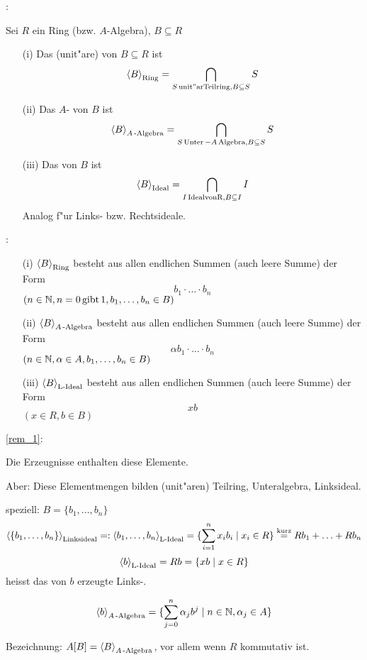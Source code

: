 :{Sei $R$ ein Ring (bzw. $A$-Algebra), $B\subseteq R$
 \begin{enumerate}
 \item[(i)] Das (unit"are)  von $B\subseteq R$ ist
 \[ {\left\langle B\right\rangle}_{\operatorname{Ring}} = \bigcap_{S \operatorname{unit"ar Teilring}, B \subseteq S} S\]
 \item[(ii)] Das $A$- von $B$ ist
 \[ {\left\langle B\right\rangle}_{A \operatorname{-Algebra}} = \bigcap_{S \operatorname{Unter}-A\operatorname{Algebra},
 B \subseteq S} S\] 
 \item[(iii)] Das  von $B$ ist
  \[ {\left\langle B\right\rangle}_{\operatorname{Ideal}} = \bigcap_{I \operatorname{Ideal von R}, B \subseteq I} I\]
  Analog f"ur Links- bzw. Rechtsideale.
 \end{enumerate}}  
\remark{}:{
 \label{rem_1}
 \begin{enumerate}
 \item[(i)] ${\left\langle B\right\rangle}_{\operatorname{Ring}}$ besteht aus allen endlichen Summen (auch leere Summe)
 der Form \[b_1 \cdot \ldots \cdot b_n \] \hfill$(n\in \mathbb N, n=0 \operatorname{gibt} 1,b_1, \ldots,b_n \in B)$
 \item[(ii)] ${\left\langle B\right\rangle}_{A \operatorname{-Algebra}}$ besteht aus allen endlichen Summen (auch leere Summe)
 der Form 
 \[\alpha b_1 \cdot \ldots \cdot b_n \] \hfill $(n\in \mathbb N, \alpha \in A, b_1, \ldots, b_n \in B)$
 \item[(iii)] ${\left\langle B\right\rangle}_{\operatorname{L-Ideal}}$ besteht aus allen endlichen Summen (auch leere Summe)
 der Form 
 \[ xb\] \hfill $ (x\in R, b\in B)$
\end{enumerate}} 
\proof \ref{rem_1}:{Die Erzeugnisse enthalten diese Elemente.

 Aber: Diese Elementmengen bilden (unit"aren) Teilring, Unteralgebra, Linksideal.

 speziell: $B=\{b_1, \ldots, b_n \}$
 \[{\left\langle\{b_1,\ldots, b_n\}\right\rangle}_{\operatorname{Linksideal}}=:{\left\langle b_1, \ldots, b_n\right\rangle}_{\operatorname{L-Ideal}}
 =\{\sum_{i=1}^{n}x_ib_i\mid x_i \in R\} \stackrel{\operatorname{kurz}}{=} Rb_1 + \ldots + Rb_n \]
 \[{\left\langle b\right\rangle}_{\operatorname{L-Ideal}}= Rb = \{ xb\mid x\in R\}\] heisst das von $b$ erzeugte 
 Links-.

 \[{\left\langle b\right\rangle}_{A \operatorname{-Algebra}} = \{ \sum_{j=0}^{n}\alpha_j b^j \mid n\in \mathbb N, \alpha_j \in A\}\]

 Bezeichnung: $A[B]={\left\langle B\right\rangle}_{A \operatorname{-Algebra}}$, vor allem wenn $R$ kommutativ ist.}
